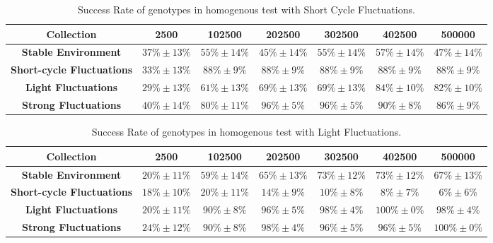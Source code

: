 \begin{table}
\caption{Success Rate of genotypes in homogenous test with Short Cycle Fluctuations.\label{tab:scshort}}
\scriptsize
\begin{tabular}{ccccccc}
\toprule%
{\textbf{Collection}} & {\textbf{2500}} & \textbf{102500} & \textbf{202500} &\textbf{302500} &\textbf{402500} &\textbf{500000} \tabularnewline
\toprule%

\textbf{Stable Environment} & $37\%\pm13\%$ & $55\%\pm14\%$ & $45\%\pm14\%$ & $55\%\pm14\%$ & $57\%\pm14\%$ & $47\%\pm14\%$ \tabularnewline
\textbf{Short-cycle Fluctuations} & $33\%\pm13\%$ & $88\%\pm9\%$ & $88\%\pm9\%$ & $88\%\pm9\%$ & $88\%\pm9\%$ & $88\%\pm9\%$ \tabularnewline
\textbf{Light Fluctuations} &$29\%\pm13\%$ & $61\%\pm13\%$ & $69\%\pm13\%$ & $69\%\pm13\%$ & $84\%\pm10\%$ & $82\%\pm10\%$ \tabularnewline
\textbf{Strong Fluctuations} &$40\%\pm14\%$ & $80\%\pm11\%$ & $96\%\pm5\%$ & $96\%\pm5\%$ & $90\%\pm8\%$ & $86\%\pm9\%$\tabularnewline

\bottomrule%
\end{tabular}%
\end{table} 

\begin{table}
\caption{Success Rate of genotypes in homogenous test with Light Fluctuations.\label{tab:scslight}}
\scriptsize
\begin{tabular}{ccccccc}
\toprule%
{\textbf{Collection}} & {\textbf{2500}} & \textbf{102500} & \textbf{202500} &\textbf{302500} &\textbf{402500} &\textbf{500000} \tabularnewline
\toprule%

\textbf{Stable Environment} & $20\%\pm11\%$ & $59\%\pm14\%$ & $65\%\pm13\%$ & $73\%\pm12\%$ & $73\%\pm12\%$ & $67\%\pm13\%$\tabularnewline
\textbf{Short-cycle Fluctuations} & $18\%\pm10\%$ & $20\%\pm11\%$ & $14\%\pm9\%$ & $10\%\pm8\%$ & $8\%\pm7\%$ & $6\%\pm6\%$\tabularnewline
\textbf{Light Fluctuations} &$20\%\pm11\%$ & $90\%\pm8\%$ & $96\%\pm5\%$ & $98\%\pm4\%$ & $100\%\pm0\%$ & $98\%\pm4\%$\tabularnewline
\textbf{Strong Fluctuations} &$24\%\pm12\%$ & $90\%\pm8\%$ & $98\%\pm4\%$ & $96\%\pm5\%$ & $96\%\pm5\%$ & $100\%\pm0\%$\tabularnewline

\bottomrule%
\end{tabular}%
\end{table} 

